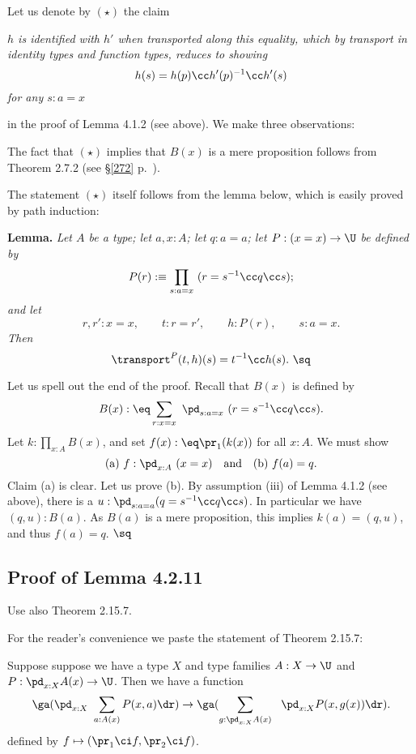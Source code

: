 \documentclass[12pt]{article}
\begin{document}
Let us denote by $(\star)$ the claim 

\nn\emph{$h$ is identified with $h'$ when transported along this equality, which by transport in identity types and function types, reduces to showing 
$$
h(s)=h(p)\cc h'(p)^{-1}\cc h'(s)
$$ 
for any $s:a=x$}

\nn in the proof of Lemma 4.1.2 (see above). We make three observations:

\nn{} The fact that $(\star)$ implies that $B(x)$ is a mere proposition follows from Theorem 2.7.2 (see \S\ref{272} p.~\pageref{272}). 

\nn{} The statement $(\star)$ itself follows from the lemma below, which is easily proved by path induction:

\nn\textbf{Lemma.} \emph{Let $A$ be a type; let $a,x:A$; let $q:a=a$; let $P:(x=x)\to\U$ be defined by} 
$$
P(r):\equiv\prod_{s:a=x}\ (r=s^{-1}\cc q\cc s);
$$ 
\emph{and let} 
$$
r,r':x=x,\qquad t:r=r',\qquad h:P(r),\qquad s:a=x.
$$ 
\emph{Then} 
$$
\transport^P(t,h)(s)=t^{-1}\cc h(s).\ \sq
$$ 

\nn{} Let us spell out the end of the proof. Recall that $B(x)$ is defined by
$$
B(x):\eq\sum_{r:x=x}\ \pd_{s:a=x}\ (r=s^{-1}\cc q\cc s).
$$ 
Let $k:\prod_{x:A}B(x)$, and set $f(x):\eq\pr_1(k(x))$ for all $x:A$. We must show 
$$
\text{(a) }f:\pd_{x:A}\ (x=x)\quad\text{and}\quad\text{(b) }f(a)=q.
$$ 
Claim (a) is clear. Let us prove (b). By assumption (iii) of Lemma 4.1.2 (see above), there is a $u:\pd_{s:a=a}(q=s^{-1}\cc q\cc s)$. In particular we have $(q,u):B(a)$. As $B(a)$ is a mere proposition, this implies $k(a)=(q,u)$, and thus $f(a)=q$. $\sq$



\subsection{Proof of Lemma 4.2.11}\label{4211}

Use also Theorem 2.15.7. 

For the reader's convenience we paste the statement of Theorem 2.15.7:

Suppose suppose we have a type $X$ and type families $A:X\to\U$ and $P:\pd_{x:X}A(x)\to\U$. Then we have a function
\begin{equation}\label{eq:sigma-ump-map}
\ga(\pd_{x:X}\ \sum_{a:A(x)}P(x,a)\dr)\to
\ga(\sum_{g:\pd_{x:X}A(x)}\ \ \pd_{x:X}P(x,g(x))\dr).
\end{equation}
defined by $f\mapsto(\pr_1\ci f,\pr_2\ci f)$.
\end{document}
